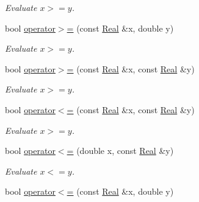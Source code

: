 \begin{DoxyCompactItemize}
\begin{DoxyCompactList}\small\item\em Evaluate $ x>=y $. \end{DoxyCompactList}\item 
\hypertarget{namespaceSpacy_aab930a27f38b29ed67f7ffafdebcd7ea}{}bool \hyperlink{namespaceSpacy_aab930a27f38b29ed67f7ffafdebcd7ea}{operator$>$=} (const \hyperlink{classSpacy_1_1Real}{Real} \&x, double y)\label{namespaceSpacy_aab930a27f38b29ed67f7ffafdebcd7ea}

\begin{DoxyCompactList}\small\item\em Evaluate $ x>=y $. \end{DoxyCompactList}\item 
\hypertarget{namespaceSpacy_ad863e76bb79f038227db1f6b04676dcb}{}bool \hyperlink{namespaceSpacy_ad863e76bb79f038227db1f6b04676dcb}{operator$>$=} (const \hyperlink{classSpacy_1_1Real}{Real} \&x, const \hyperlink{classSpacy_1_1Real}{Real} \&y)\label{namespaceSpacy_ad863e76bb79f038227db1f6b04676dcb}

\begin{DoxyCompactList}\small\item\em Evaluate $ x>=y $. \end{DoxyCompactList}\item 
\hypertarget{namespaceSpacy_a0cd7280c4145ac83a846d508b4c13039}{}bool \hyperlink{namespaceSpacy_a0cd7280c4145ac83a846d508b4c13039}{operator$<$=} (const \hyperlink{classSpacy_1_1Real}{Real} \&x, const \hyperlink{classSpacy_1_1Real}{Real} \&y)\label{namespaceSpacy_a0cd7280c4145ac83a846d508b4c13039}

\begin{DoxyCompactList}\small\item\em Evaluate $ x>=y $. \end{DoxyCompactList}\item 
\hypertarget{namespaceSpacy_ab2f3c935fd01be4d5146e8ecd286003a}{}bool \hyperlink{namespaceSpacy_ab2f3c935fd01be4d5146e8ecd286003a}{operator$<$=} (double x, const \hyperlink{classSpacy_1_1Real}{Real} \&y)\label{namespaceSpacy_ab2f3c935fd01be4d5146e8ecd286003a}

\begin{DoxyCompactList}\small\item\em Evaluate $ x<=y $. \end{DoxyCompactList}\item 
\hypertarget{namespaceSpacy_a64f7497786c3d7aba20c72bbd0d104b8}{}bool \hyperlink{namespaceSpacy_a64f7497786c3d7aba20c72bbd0d104b8}{operator$<$=} (const \hyperlink{classSpacy_1_1Real}{Real} \&x, double y)\label{namespaceSpacy_a64f7497786c3d7aba20c72bbd0d104b8}


\end{DoxyCompactItemize}
